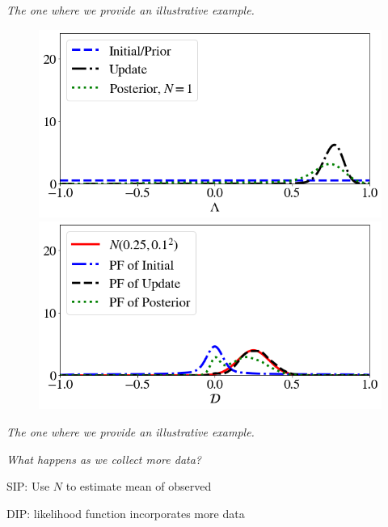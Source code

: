 \begin{frame}{\it The one where we provide an illustrative example.}

\begin{figure}
\centering
\vbox{
   \includegraphics[width=0.6\linewidth]{figures/bip-vs-sip-1.png}
   \includegraphics[width=0.6\linewidth]{figures/bip-vs-sip-pf-1.png}
}
 \label{fig:bayes-comparison}
\end{figure}

\end{frame}


\begin{frame}{\it The one where we provide an illustrative example.}

\centering
\emph{What happens as we collect more data?}
\bigskip

\bigskip
SIP: Use $N$ to estimate mean of observed

\bigskip
DIP: likelihood function incorporates more data

\end{frame}

